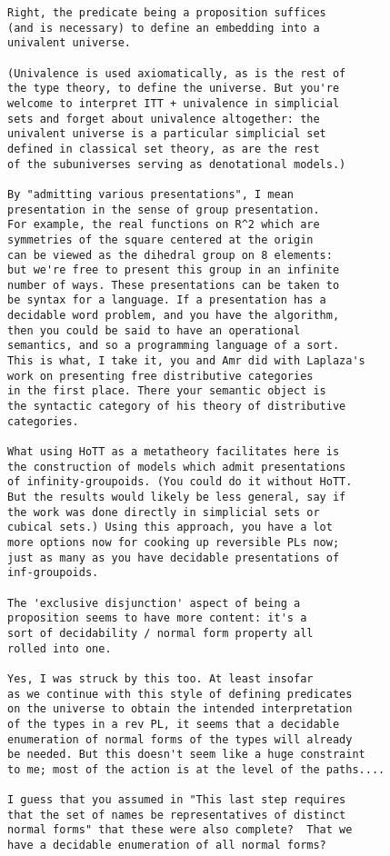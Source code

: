 \documentclass{entcs}
\begin{document}
\begin{verbatim}
Right, the predicate being a proposition suffices
(and is necessary) to define an embedding into a
univalent universe.

(Univalence is used axiomatically, as is the rest of
the type theory, to define the universe. But you're
welcome to interpret ITT + univalence in simplicial
sets and forget about univalence altogether: the
univalent universe is a particular simplicial set
defined in classical set theory, as are the rest
of the subuniverses serving as denotational models.)

By "admitting various presentations", I mean
presentation in the sense of group presentation.
For example, the real functions on R^2 which are
symmetries of the square centered at the origin
can be viewed as the dihedral group on 8 elements:
but we're free to present this group in an infinite
number of ways. These presentations can be taken to
be syntax for a language. If a presentation has a
decidable word problem, and you have the algorithm,
then you could be said to have an operational
semantics, and so a programming language of a sort.
This is what, I take it, you and Amr did with Laplaza's
work on presenting free distributive categories
in the first place. There your semantic object is
the syntactic category of his theory of distributive
categories.

What using HoTT as a metatheory facilitates here is
the construction of models which admit presentations
of infinity-groupoids. (You could do it without HoTT.
But the results would likely be less general, say if
the work was done directly in simplicial sets or
cubical sets.) Using this approach, you have a lot
more options now for cooking up reversible PLs now;
just as many as you have decidable presentations of
inf-groupoids.

The 'exclusive disjunction' aspect of being a
proposition seems to have more content: it's a
sort of decidability / normal form property all
rolled into one.

Yes, I was struck by this too. At least insofar
as we continue with this style of defining predicates
on the universe to obtain the intended interpretation
of the types in a rev PL, it seems that a decidable
enumeration of normal forms of the types will already
be needed. But this doesn't seem like a huge constraint
to me; most of the action is at the level of the paths....

I guess that you assumed in "This last step requires
that the set of names be representatives of distinct
normal forms" that these were also complete?  That we
have a decidable enumeration of all normal forms?


\end{verbatim}
\end{document}
